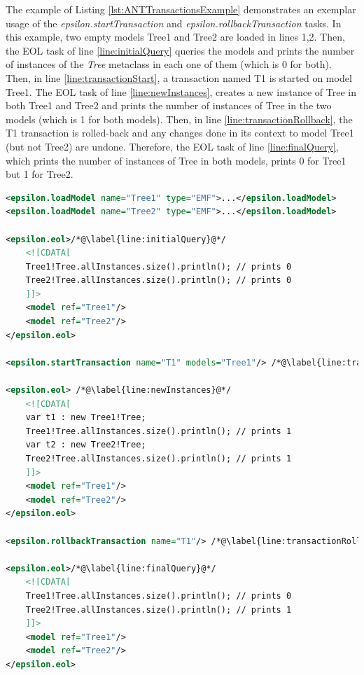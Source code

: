The example of Listing \ref{lst:ANTTransactionsExample} demonstrates an exemplar usage of the \emph{epsilon.startTransaction} and \emph{epsilon.rollbackTransaction} tasks. In this example, two empty models Tree1 and Tree2 are loaded in lines 1,2. Then, the EOL task of line \ref{line:initialQuery} queries the models and prints the number of instances of the \emph{Tree} metaclass in each one of them (which is 0 for both). Then, in line \ref{line:transactionStart}, a transaction named T1 is started on model Tree1. The EOL task of line \ref{line:newInstances}, creates a new instance of Tree in both Tree1 and Tree2 and prints the number of instances of Tree in the two models (which is 1 for both models). Then, in line \ref{line:transactionRollback}, the T1 transaction is rolled-back and any changes done in its context to model Tree1 (but not Tree2) are undone. Therefore, the EOL task of line \ref{line:finalQuery}, which prints the number of instances of Tree in both models, prints 0 for Tree1 but 1 for Tree2.

\begin{lstlisting}[caption=Exemplar usage of the \emph{epsilon.startTransaction} and \emph{epsilon.rollbackTransaction} tasks, label=lst:ANTTransactionsExample, language=XML]
<epsilon.loadModel name="Tree1" type="EMF">...</epsilon.loadModel>
<epsilon.loadModel name="Tree2" type="EMF">...</epsilon.loadModel>

<epsilon.eol>/*@\label{line:initialQuery}@*/
	<![CDATA[
	Tree1!Tree.allInstances.size().println(); // prints 0 
	Tree2!Tree.allInstances.size().println(); // prints 0
	]]>
	<model ref="Tree1"/>
	<model ref="Tree2"/>
</epsilon.eol>

<epsilon.startTransaction name="T1" models="Tree1"/> /*@\label{line:transactionStart}@*/

<epsilon.eol> /*@\label{line:newInstances}@*/
	<![CDATA[
	var t1 : new Tree1!Tree; 
	Tree1!Tree.allInstances.size().println(); // prints 1
	var t2 : new Tree2!Tree;
	Tree2!Tree.allInstances.size().println(); // prints 1
	]]>
	<model ref="Tree1"/>
	<model ref="Tree2"/>
</epsilon.eol>

<epsilon.rollbackTransaction name="T1"/> /*@\label{line:transactionRollback}@*/

<epsilon.eol>/*@\label{line:finalQuery}@*/
	<![CDATA[
	Tree1!Tree.allInstances.size().println(); // prints 0 
	Tree2!Tree.allInstances.size().println(); // prints 1 
	]]>
	<model ref="Tree1"/>
	<model ref="Tree2"/>
</epsilon.eol>
\end{lstlisting}

